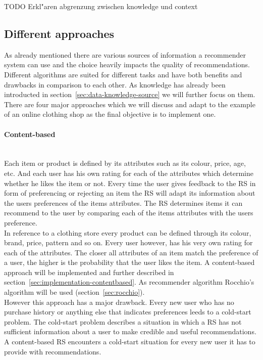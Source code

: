 {\color{red}TODO Erkl"aren abgrenzung zwischen knowledge und context}


\subsection{Different approaches}
\label{sec:recommenderapproaches}
As already mentioned there are various sources of information a recommender system can use and the choice heavily impacts the quality of recommendations.
Different algorithms are suited for different tasks and have both benefits and drawbacks in comparison to each other.\citep[p.~377-378]{burke:2007}
As knowledge has already been introducted in section~\ref{sec:data-knowledge-source} we will further focus on them.
There are four major approaches \citep[p.~378]{burke:2007} which we will discuss and adapt to the example of an online clothing shop as the final objective is to implement one.

\paragraph{Content-based}\hfill\\
Each item or product is defined by its attributes such as its colour, price, age, etc.
And each user has his own rating for each of the attributes which determine whether he likes the item or not.
Every time the user gives feedback to the RS in form of preferencing or rejecting an item the RS will adapt its information about the users preferences of the items attributes.
The RS determines items it can recommend to the user by comparing each of the items attributes with the users preference.
\citep[p.~75]{lops:2011}\\
In reference to a clothing store every product can be defined through its colour, brand, price, pattern and so on.
Every user however, has his very own rating for each of the attributes.
The closer all attributes of an item match the preference of a user, the higher is the probability that the user likes the item.
A content-based approach will be implemented and further described in section~\ref{sec:implementation-contentbased}.
As recommender algorithm Rocchio's algorithm will be used (section~\ref{sec:rocchio}).
\\
However this approach has a major drawback.
Every new user who has no purchase history or anything else that indicates preferences leeds to a  cold-start problem.
The cold-start problem describes a situation in which a RS has not sufficient information about a user to make credible and useful recommendations.
A content-based RS encounters a cold-start situation for every new user it has to provide with recommendations.
\citep[p.~378-379]{burke:2007}

